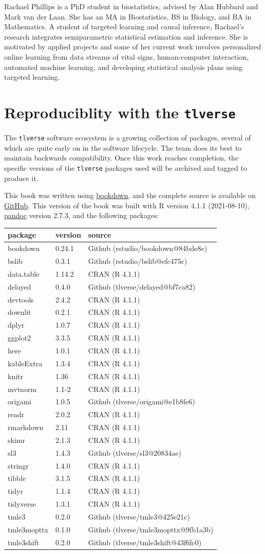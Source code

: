 \documentclass[
  12pt, krantz2,
]{book}
\newcommand{\passthrough}[1]{#1}
\theoremstyle{definition}
\theoremstyle{definition}
\theoremstyle{definition}
\newcommand{\1}{\mathbbm{1}}
\begin{document}
Rachael Phillips is a PhD student in biostatistics, advised by Alan Hubbard and
Mark van der Laan. She has an MA in Biostatistics, BS in Biology, and BA in
Mathematics. A student of targeted learning and causal inference, Rachael's
research integrates semiparametric statistical estimation and inference. She is
motivated by applied projects and some of her current work involves personalized
online learning from data streams of vital signs, human-computer interaction,
automated machine learning, and developing statistical analysis plans using
targeted learning.

\hypertarget{repro}{%
\section{\texorpdfstring{Reproduciblity with the \texttt{tlverse}}{Reproduciblity with the tlverse}}\label{repro}}

The \passthrough{\lstinline!tlverse!} software ecosystem is a growing collection of packages, several of
which are quite early on in the software lifecycle. The team does its best to
maintain backwards compatibility. Once this work reaches completion, the
specific versions of the \passthrough{\lstinline!tlverse!} packages used will be archived and tagged to
produce it.

This book was written using \href{http://bookdown.org/}{bookdown}, and the complete
source is available on \href{https://github.com/tlverse/tlverse-handbook}{GitHub}.
This version of the book was built with R version 4.1.1 (2021-08-10),
\href{https://pandoc.org/}{pandoc} version 2.7.3, and the
following packages:

\begin{longtable}[]{@{}lll@{}}
\toprule
package & version & source\tabularnewline
\midrule
\endhead
bookdown & 0.24.1 & Github (rstudio/bookdown@84bde8e)\tabularnewline
bslib & 0.3.1 & Github (rstudio/bslib@efc475c)\tabularnewline
data.table & 1.14.2 & CRAN (R 4.1.1)\tabularnewline
delayed & 0.4.0 & Github (tlverse/delayed@bf7ca82)\tabularnewline
devtools & 2.4.2 & CRAN (R 4.1.1)\tabularnewline
downlit & 0.2.1 & CRAN (R 4.1.1)\tabularnewline
dplyr & 1.0.7 & CRAN (R 4.1.1)\tabularnewline
ggplot2 & 3.3.5 & CRAN (R 4.1.1)\tabularnewline
here & 1.0.1 & CRAN (R 4.1.1)\tabularnewline
kableExtra & 1.3.4 & CRAN (R 4.1.1)\tabularnewline
knitr & 1.36 & CRAN (R 4.1.1)\tabularnewline
mvtnorm & 1.1-2 & CRAN (R 4.1.1)\tabularnewline
origami & 1.0.5 & Github (tlverse/origami@e1b8fe6)\tabularnewline
readr & 2.0.2 & CRAN (R 4.1.1)\tabularnewline
rmarkdown & 2.11 & CRAN (R 4.1.1)\tabularnewline
skimr & 2.1.3 & CRAN (R 4.1.1)\tabularnewline
sl3 & 1.4.3 & Github (tlverse/sl3@20834ae)\tabularnewline
stringr & 1.4.0 & CRAN (R 4.1.1)\tabularnewline
tibble & 3.1.5 & CRAN (R 4.1.1)\tabularnewline
tidyr & 1.1.4 & CRAN (R 4.1.1)\tabularnewline
tidyverse & 1.3.1 & CRAN (R 4.1.1)\tabularnewline
tmle3 & 0.2.0 & Github (tlverse/tmle3@425e21c)\tabularnewline
tmle3mopttx & 0.1.0 & Github (tlverse/tmle3mopttx@9fb1a3b)\tabularnewline
tmle3shift & 0.2.0 & Github (tlverse/tmle3shift@43f6fc0)\tabularnewline
\bottomrule
\end{longtable}
\end{document}
